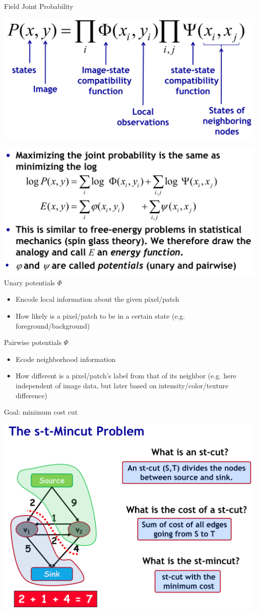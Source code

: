 Field Joint Probability

\includegraphics[width=0.7\columnwidth]{pictures/fieldjointprobability}

\includegraphics[width=\columnwidth]{pictures/energyfunction}
Unary potentials $\Phi$
\begin{itemize}
	\item Encode local information about the given pixel/patch
	\item How likely is a pixel/patch to be in a certain state (e.g. foreground/background)
\end{itemize}
Pairwise potentials $\Psi$
\begin{itemize}
	\item Ecode neighborhood information
	\item How different is a pixel/patch's label from that of its neighbor (e.g. here independent of image data, but later based on intensity/color/texture difference)
\end{itemize}

Goal: minimum cost cut

\includegraphics[width=\columnwidth]{pictures/s-t-min-cut}

